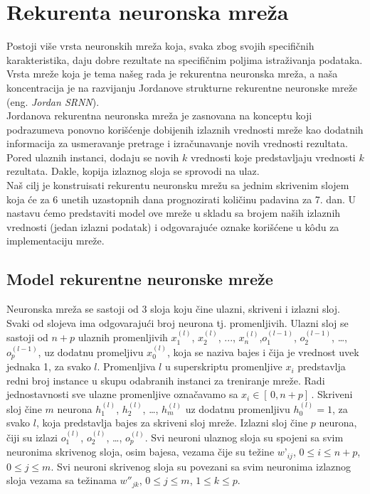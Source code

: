 \documentclass[a4paper]{article}
\begin{document}
\section{Rekurenta neuronska mreža}
\label{sec:model}

Postoji više vrsta neuronskih mreža koja, svaka zbog svojih specifičnih karakteristika, daju dobre rezultate na specifičnim poljima istraživanja podataka. Vrsta mreže koja je tema našeg rada je rekurentna neuronska mreža, a naša koncentracija je na razvijanju Jordanove strukturne rekurentne neuronske mreže (eng. \textit{Jordan SRNN}).\\
\indent Jordanova rekurentna neuronska mreža je zasnovana na konceptu koji podrazumeva ponovno korišćenje dobijenih izlaznih vrednosti mreže kao dodatnih informacija za usmeravanje pretrage i izračunavanje novih vrednosti rezultata. Pored ulaznih instanci, dodaju se novih $k$ vrednosti koje predstavljaju vrednosti $k$ rezultata. Dakle, kopija izlaznog sloja se sprovodi na ulaz.\\
\indent Naš cilj je konstruisati rekurentu neuronsku mrežu sa jednim skrivenim slojem koja će za 6 unetih uzastopnih dana prognozirati količinu padavina za 7. dan. U nastavu ćemo predstaviti model ove mreže u skladu sa brojem naših izlaznih vrednosti (jedan izlazni podatak) i odgovarajuće oznake korišćene u k\^{o}du za implementaciju mreže.

\subsection{Model rekurentne neuronske mreže}
\label{sec:model}

Neuronska mreža se sastoji od 3 sloja koju čine ulazni, skriveni i izlazni sloj. Svaki od slojeva ima odgovarajući broj neurona tj. promenljivih.
Ulazni sloj se sastoji od $n+p$ ulaznih promenljivih $x^{(l)}_1$, $x^{(l)}_2$, ..., $x^{(l)}_n$,$o^{(l-1)}_1$, $o^{(l-1)}_2$, …, $o^{(l-1)}_p$,  uz dodatnu promeljivu $x^{(l)}_0$, koja se naziva bajes i čija je vrednost uvek jednaka 1, za svako $l$. Promenljiva $l$ u superskriptu promenljive $x_i$ predstavlja redni broj instance u skupu odabranih instanci za treniranje mreže. Radi jednostavnosti sve ulazne promenljive označavamo sa $x_i {}\in{}[ \,0,n+p ] \,$. Skriveni sloj čine $m$ neurona $h^{(l)}_1$, $h^{(l)}_2$, …, $h^{(l)}_m$ uz dodatnu promenljivu $h^{(l)}_0=1$, za svako $l$, koja predstavlja bajes za skriveni sloj mreže. Izlazni sloj čine $p$ neurona, čiji su izlazi $o^{(l)}_1$, $o^{(l)}_2$, …, $o^{(l)}_p$. Svi neuroni ulaznog sloja su spojeni sa svim neuronima skrivenog sloja, osim bajesa, vezama čije su težine $w’_{ij}$, $0\leq{}i\leq{}n+p$, $0\leq{}j\leq{}m$. Svi neuroni skrivenog sloja su povezani sa svim neuronima izlaznog sloja vezama sa težinama $w{''}_{jk}$, $0\leq{}j\leq{}m$, $1\leq{}k\leq{}p$. 
\end{document}
